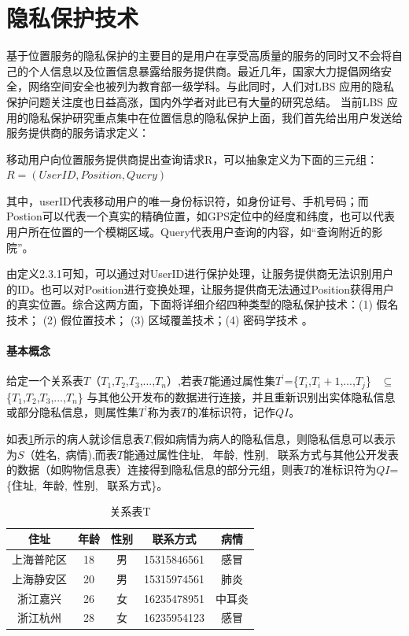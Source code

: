 \section{隐私保护技术}
基于位置服务的隐私保护的主要目的是用户在享受高质量的服务的同时又不会将自己的个人信息以及位置信息暴露给服务提供商。最近几年，国家大力提倡网络安全，网络空间安全也被列为教育部一级学科。与此同时，人们对LBS 应用的隐私保护问题关注度也日益高涨，国内外学者对此已有大量的研究总结\cite{group}\cite{Beresford}\cite{ChengR}。 当前LBS 应用的隐私保护研究重点集中在位置信息的隐私保护上面，我们首先给出用户发送给服务提供商的服务请求定义：
\begin{define}[：LBS服务请求]
移动用户向位置服务提供商提出查询请求R，可以抽象定义为下面的三元组：
$R=(UserID,Position,Query)$
\end{define}
其中，userID代表移动用户的唯一身份标识符，如身份证号、手机号码；而Postion可以代表一个真实的精确位置，如GPS定位中的经度和纬度，也可以代表用户所在位置的一个模糊区域。Query代表用户查询的内容，如“查询附近的影院”。

由定义2.3.1可知，可以通过对UserID进行保护处理，让服务提供商无法识别用户的ID。也可以对Position进行变换处理，让服务提供商无法通过Position获得用户的真实位置。综合这两方面，下面将详细介绍四种类型的隐私保护技术：(1) 假名技术； (2) 假位置技术； (3) 区域覆盖技术；(4) 密码学技术 。
\paragraph{基本概念}
\begin{define}[准标识符]
给定一个关系表$T$（$T_1$,$T_2$,$T_3$,...,$T_n$）,若表$T$能通过属性集$T^’$=\{$T_i$,$T_i+1$,...,$T_j$\} ~$\subseteq$~ \{$T_1$,$T_2$,$T_3$,...,$T_n$\} 与其他公开发布的数据进行连接，并且重新识别出实体隐私信息或部分隐私信息，则属性集$T^’$称为表$T$的准标识符，记作$QI$。
\end{define}

如表\ref{k-anony}所示的病人就诊信息表$T$,假如病情为病人的隐私信息，则隐私信息可以表示为$S$（姓名,~病情),而表$T$能通过属性{住址,~ 年龄,~性别,~ 联系方式}与其他公开发表的数据（如购物信息表）连接得到隐私信息的部分元组，则表$T$的准标识符为$QI$=\{住址,~年龄,~性别,~ 联系方式\}。
\begin{table}[hbp]
\label{k-anony}
\centering  %
\begin{tabular}{ccccc}  %
\hline
住址 &年龄&性别 &联系方式&病情\\ \hline  %
上海普陀区&18 &男 &15315846561 &感冒\\         %
上海静安区 &20 &男 &15315974561 &肺炎\\        %
浙江嘉兴 &26 &女 &16235478951 &中耳炎\\
浙江杭州 &28 &女 &16235954123 &感冒\\ \hline
\end{tabular}
\caption{关系表T}
\end{table}

